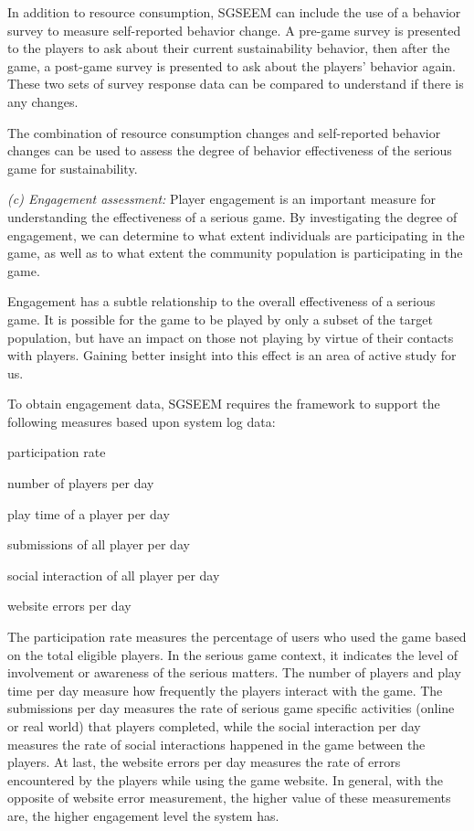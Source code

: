 \documentclass{sigchi}
\begin{document}
In addition to resource consumption, SGSEEM can include the use of a
behavior survey to measure self-reported behavior
change. A pre-game survey is presented to the players to ask about
their current sustainability behavior, then after the game, a post-game
survey is presented to ask about the players' behavior again. These two
sets of survey response data can be compared to understand if there is
any changes.

The combination of resource consumption changes and self-reported
behavior changes can be used to assess the degree of behavior
effectiveness of the serious game for sustainability.

\emph {(c) Engagement assessment:} Player engagement is an important measure for
understanding the effectiveness of a serious game. By investigating the degree of
engagement, we can determine to what extent individuals are participating in the game, as
well as to what extent the community population is participating in the game.

Engagement has a subtle relationship to the overall effectiveness of a serious game. It is
possible for the game to be played by only a subset of the target population, but
have an impact on those not playing by virtue of their contacts with players. Gaining
better insight into this effect is an area of active study for us. 

To obtain engagement data, SGSEEM requires the framework to support the following measures
based upon system log data: 

\begin{compactitem}
\item participation rate
\item number of players per day
\item play time of a player per day
\item submissions of all player per day
\item social interaction of all player per day
\item website errors per day
\end{compactitem}

The participation rate measures the percentage of users who used the game based on the total
eligible players. In the serious game context, it indicates the level of involvement or awareness
of the serious matters. The number of players and play time per day measure how frequently the
players interact with the game. The submissions per day measures the rate of serious game
specific activities (online or real world) that players completed, while the social interaction
per day measures the rate of social interactions happened in the game between the players. At
last, the website errors per day measures the rate of errors encountered by the players while
using the game website. In general, with the opposite of website error measurement, the higher
value of these measurements are, the higher engagement level the system has.
\end{document}
